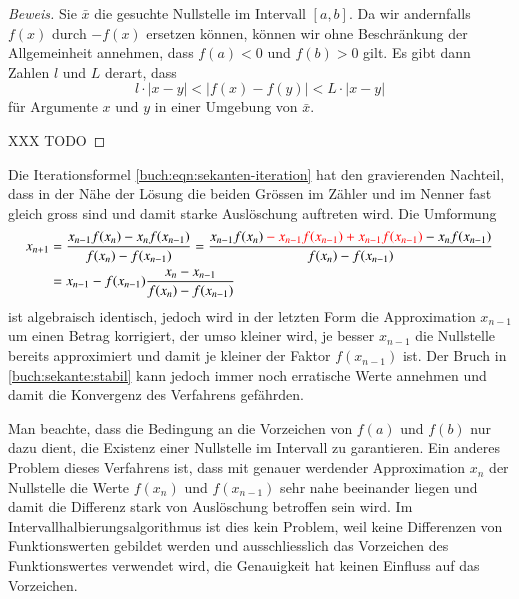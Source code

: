 \begin{proof}[Beweis]
Sie $\bar{x}$ die gesuchte Nullstelle im Intervall $[a,b]$.
Da wir andernfalls $f(x)$ durch $-f(x)$ ersetzen können, können wir
ohne Beschränkung der Allgemeinheit annehmen, dass $f(a)<0$
und $f(b)>0$ gilt.
Es gibt dann Zahlen $l$ und $L$ derart, dass
\[
l\cdot |x-y|
<
|f(x)-f(y)|
<
L\cdot |x-y|
\]
für Argumente $x$ und $y$ in einer Umgebung von $\bar{x}$.

XXX TODO
\end{proof}

Die Iterationsformel \eqref{buch:eqn:sekanten-iteration} hat den
gravierenden Nachteil, dass in der Nähe der Lösung die beiden
Grössen im Zähler und im Nenner fast gleich gross sind und damit
starke Auslöschung auftreten wird.
Die Umformung
\begin{align}
x_{n+1}
&=
\frac{x_{n-1}f(x_{n})-x_{n}f(x_{n-1})}{f(x_n)-f(x_{n-1})}
=
\frac{x_{n-1}f(x_{n})
{\color{red}\mathstrut -x_{n-1}f(x_{n-1})+x_{n-1}f(x_{n-1})}
-x_{n}f(x_{n-1})}{f(x_n)-f(x_{n-1})}
\\
&=x_{n-1} - f(x_{n-1})\frac{x_n-x_{n-1}}{f(x_n)-f(x_{n-1})}
\label{buch:sekante:stabil}
\end{align}
ist algebraisch identisch, jedoch wird in der letzten Form die Approximation
$x_{n-1}$ um einen Betrag korrigiert, der umso kleiner wird, je besser
$x_{n-1}$ die Nullstelle bereits approximiert und damit je kleiner
der Faktor $f(x_{n-1})$ ist.
Der Bruch in \eqref{buch:sekante:stabil} kann jedoch immer noch
erratische Werte annehmen und damit die Konvergenz des Verfahrens
gefährden.

Man beachte, dass die Bedingung an die Vorzeichen von $f(a)$ und $f(b)$
nur dazu dient, die Existenz einer Nullstelle im Intervall zu garantieren.
Ein anderes Problem dieses Verfahrens ist, dass mit genauer werdender
Approximation $x_n$ der Nullstelle die Werte $f(x_n)$ und $f(x_{n-1})$
sehr nahe beeinander liegen und damit die Differenz stark von 
Auslöschung betroffen sein wird.
Im Intervallhalbierungsalgorithmus ist dies kein Problem, weil keine
Differenzen von Funktionswerten gebildet werden und ausschliesslich das
Vorzeichen des Funktionswertes verwendet wird, die Genauigkeit hat
keinen Einfluss auf das Vorzeichen.



